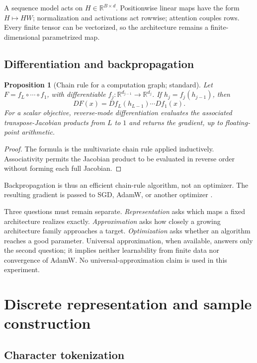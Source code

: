 \documentclass[11pt]{article}
\newtheorem{proposition}[definition]{Proposition}
\newcommand{\R}{\mathbb R}
\newcommand{\1}{\mathbf 1}
\begin{document}
A sequence model acts on $H\in\R^{B\times d}$. Positionwise linear maps have
the form $H\mapsto HW$; normalization and activations act rowwise; attention
couples rows. Every finite tensor can be vectorized, so the architecture remains
a finite-dimensional parametrized map.

\subsection{Differentiation and backpropagation}

\begin{proposition}[Chain rule for a computation graph; standard]
Let $F=f_L\circ\cdots\circ f_1$, with differentiable
$f_j:\R^{d_{j-1}}\to\R^{d_j}$. If $h_j=f_j(h_{j-1})$, then
\[
 DF(x)=Df_L(h_{L-1})\cdots Df_1(x).
\]
For a scalar objective, reverse-mode differentiation evaluates the associated
transpose-Jacobian products from $L$ to $1$ and returns the gradient, up to
floating-point arithmetic.
\end{proposition}

\begin{proof}
The formula is the multivariate chain rule applied inductively. Associativity
permits the Jacobian product to be evaluated in reverse order without forming
each full Jacobian.
\end{proof}

Backpropagation is thus an efficient chain-rule algorithm, not an optimizer.
The resulting gradient is passed to SGD, AdamW, or another optimizer
\cite{rumelhart-1986-learning}.

Three questions must remain separate. \emph{Representation} asks which maps a
fixed architecture realizes exactly. \emph{Approximation} asks how closely a
growing architecture family approaches a target. \emph{Optimization} asks
whether an algorithm reaches a good parameter. Universal approximation, when
available, answers only the second question; it implies neither learnability
from finite data nor convergence of AdamW. No universal-approximation claim is
used in this experiment.

\section{Discrete representation and sample construction}

\subsection{Character tokenization}
\end{document}
